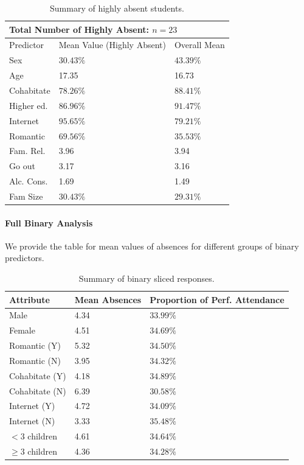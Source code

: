 \documentclass[12pt, titlepage]{article}
\begin{document}
	\begin{table}[h!]
		\centering
		\begin{tabular}{|l|l|l|}
			\multicolumn{3}{l}{Total Number of Highly Absent: $n = 23$} \\
			\hline
			Predictor & Mean Value (Highly Absent) & Overall Mean \\
			\hline
			Sex & $30.43\%$ & $43.39 \%$ \\
			Age & 17.35 & 16.73 \\
			Cohabitate & $78.26\%$ & $88.41\%$ \\
			Higher ed. & $86.96\%$ & $91.47\%$ \\
			Internet & $95.65\%$ & $79.21\%$ \\
			Romantic & $69.56\%$ & $35.53\%$ \\
			Fam. Rel. & 3.96 & 3.94 \\
			Go out & 3.17 & 3.16 \\
			Alc. Cons. & 1.69 & 1.49 \\
			Fam Size & $30.43\%$ & $29.31\%$\\
			\hline
		\end{tabular}
	\caption{Summary of highly absent students.}
	\end{table}

	\paragraph{Full Binary Analysis} We provide the table for mean values of absences for different groups of binary predictors.
	
	\begin{table}[h!]
		\centering
		\begin{tabular}{|l|l|l|}
			\hline
			Attribute & Mean Absences & Proportion of Perf. Attendance \\
			\hline
			Male & 4.34 & $33.99\%$ \\
			Female & 4.51 & $34.69\%$ \\
			\hline
			Romantic (Y) & 5.32 & $34.50\%$ \\
			Romantic (N) & 3.95 & $34.32\%$ \\
			\hline
			Cohabitate (Y) & 4.18 & $34.89\%$ \\
			Cohabitate (N) & 6.39 & $30.58\%$ \\
			\hline
			Internet (Y) & 4.72 & $34.09\%$ \\
			Internet (N) & 3.33 & $35.48\%$ \\
			\hline
			$<3$ children & 4.61 & $34.64\%$ \\
			$\geq 3$ children & 4.36 & $34.28\%$ \\
			\hline
		\end{tabular}
	\caption{Summary of binary sliced responses.}
	\end{table}
	
\end{document}
